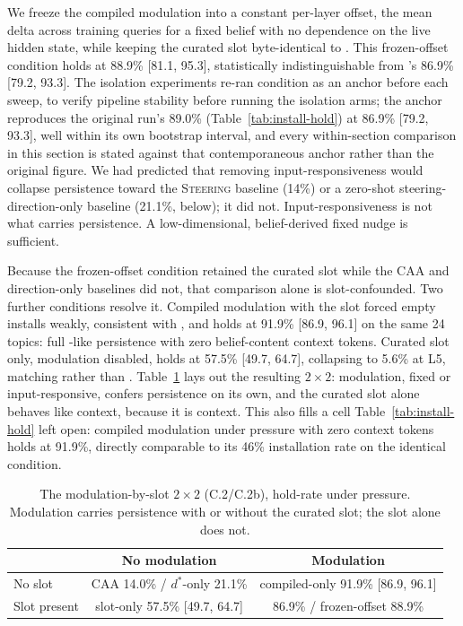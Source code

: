 We freeze the compiled modulation into a constant per-layer offset, the mean delta
across training queries for a fixed belief with no dependence on the live hidden state,
while keeping the curated slot byte-identical to \condF{}. This frozen-offset condition
holds at 88.9\% [81.1, 95.3], statistically indistinguishable from \condF{}'s 86.9\%
[79.2, 93.3]. The isolation experiments re-ran condition \condF{} as an anchor before
each sweep, to verify pipeline stability before running the isolation arms; the anchor
reproduces the original run's 89.0\% (Table~\ref{tab:install-hold}) at 86.9\% [79.2,
93.3], well within its own bootstrap interval, and every within-section comparison in
this section is stated against that contemporaneous anchor rather than the original
figure. We had predicted that removing input-responsiveness would collapse persistence
toward the \textsc{Steering} baseline (14\%) or a zero-shot steering-direction-only baseline (21.1\%,
below); it did not. Input-responsiveness is not what carries persistence. A
low-dimensional, belief-derived fixed nudge is sufficient.

Because the frozen-offset condition retained the curated slot while the CAA and
direction-only baselines did not, that comparison alone is slot-confounded. Two further
conditions resolve it. Compiled modulation with the slot forced empty installs weakly,
consistent with \condC{}, and holds at 91.9\% [86.9, 96.1] on the same 24 topics: full
\condF{}-like persistence with zero belief-content context tokens. Curated slot only,
modulation disabled, holds at 57.5\% [49.7, 64.7], collapsing to 5.6\% at L5, matching
\condB{} rather than \condF{}. Table~\ref{tab:mechanism-2x2} lays out the resulting
\(2\times2\): modulation, fixed or input-responsive, confers persistence on its own, and
the curated slot alone behaves like context, because it is context. This also fills a
cell Table~\ref{tab:install-hold} left open: compiled modulation under pressure with
zero context tokens holds at 91.9\%, directly comparable to its 46\% installation rate
on the identical condition.

\begin{table}[t]
\centering
\caption{The modulation-by-slot \(2\times2\) (C.2/C.2b), hold-rate under pressure.
Modulation carries persistence with or without the curated slot; the slot alone does
not.}
\label{tab:mechanism-2x2}
\begin{tabular}{lcc}
\toprule
& No modulation & Modulation \\
\midrule
No slot & CAA 14.0\% / \(d^*\)-only 21.1\% & compiled-only 91.9\% [86.9, 96.1] \\
Slot present & slot-only 57.5\% [49.7, 64.7] & \condF{} 86.9\% / frozen-offset 88.9\% \\
\bottomrule
\end{tabular}
\end{table}

